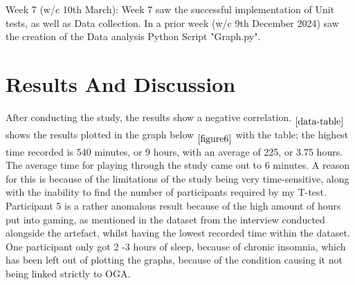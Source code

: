\documentclass[conference]{IEEEtran}
\begin{document}
Week 7 (w/c 10th March):
Week 7 saw the successful implementation of Unit tests, as well as Data collection. In a prior week (w/c 9th December 2024) saw the creation of the Data analysis Python Script "Graph.py".\\

\section{Results And Discussion}
\begin{table}[H]
\centering
{}
\caption{Table 1 - The data collected from the experiment over two weeks.}
\label{data-table}
\end{table}

After conducting the study, the results show a negative correlation. $ _{\ref{data-table}}$ shows the results plotted in the graph below $_{\ref{figure6}}$ with the table; the highest time recorded is 540 minutes, or 9 hours, with an average of 225, or 3.75 hours. The average time for playing through the study came out to 6 minutes. A reason for this is because of the limitations of the study being very time-sensitive, along with the inability to find the number of participants required by my T-test. Participant 5 is a rather anomalous result because of the high amount of hours put into gaming, as mentioned in the dataset from the interview conducted alongside the artefact, whilst having the lowest recorded time within the dataset. One participant only got 2 -3 hours of sleep, because of chronic insomnia, which has been left out of plotting the graphs, because of the condition causing it not being linked strictly to OGA.
\end{document}
